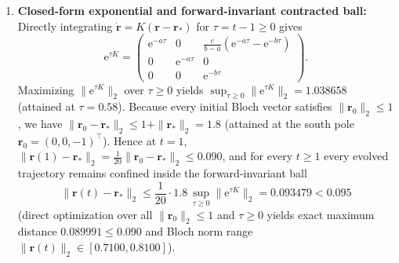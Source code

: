 \documentclass[onecolumn,10pt,notitlepage,amsmath,amssymb,floatfix]{revtex4-2}
\theoremstyle{plain}
\theoremstyle{definition}
\newcommand{\ee}{\mathrm{e}}
\begin{document}
\begin{enumerate}[label=(\roman*),leftmargin=1.8em,itemsep=2pt]
\item \textbf{Closed-form exponential and forward-invariant contracted ball:} Directly integrating $\dot{\mathbf{r}} = K(\mathbf{r}-\mathbf{r}_*)$ for $\tau = t - 1 \ge 0$ gives
\begin{equation}
\label{eq:S5_expK}
\ee^{\tau K} = \begin{pmatrix}
\ee^{-a\tau} & 0 & \frac{c}{b-a}(\ee^{-a\tau} - \ee^{-b\tau}) \\
0 & \ee^{-a\tau} & 0 \\
0 & 0 & \ee^{-b\tau}
\end{pmatrix}.
\end{equation}
Maximizing $\|\ee^{\tau K}\|_2$ over $\tau \ge 0$ yields $\sup_{\tau\ge 0}\|\ee^{\tau K}\|_2 = 1.038658$ (attained at $\tau = 0.58$). Because every initial Bloch vector satisfies $\|\mathbf{r}_0\|_2 \le 1$, we have $\|\mathbf{r}_0 - \mathbf{r}_*\|_2 \le 1 + \|\mathbf{r}_*\|_2 = 1.8$ (attained at the south pole $\mathbf{r}_0 = (0,0,-1)^\top$). Hence at $t = 1$, $\|\mathbf{r}(1)-\mathbf{r}_*\|_2 = \frac{1}{20}\|\mathbf{r}_0 - \mathbf{r}_*\|_2 \le 0.090$, and for every $t \ge 1$ every evolved trajectory remains confined inside the forward-invariant ball
\begin{equation}
\label{eq:S5_inv_ball}
\|\mathbf{r}(t) - \mathbf{r}_*\|_2 \le \frac{1}{20}\cdot 1.8\,\sup_{\tau\ge 0}\|\ee^{\tau K}\|_2 = 0.093479 < 0.095
\end{equation}
(direct optimization over all $\|\mathbf{r}_0\|_2 \le 1$ and $\tau \ge 0$ yields exact maximum distance $0.089991 \le 0.090$ and Bloch norm range $\|\mathbf{r}(t)\|_2 \in [0.7100, 0.8100]$).

\end{enumerate}
\end{document}
